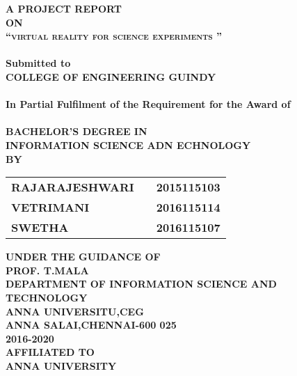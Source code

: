 \newpage
\begin{center}
\thispagestyle{empty}
\Large{\textbf{A PROJECT REPORT\\ \large{ON}}}\\[0.7cm]
\LARGE{\textsc {\textbf{``virtual reality for science experiments ''}}}\\[0.5cm]
\vspace{0.5cm}
\Large{\textbf{\\Submitted to}}
\LARGE{\textbf{\\COLLEGE OF ENGINEERING GUINDY\\}}
\vspace{1cm}
\Large{\textbf{\\In Partial Fulfilment of the Requirement for the Award of\\}}
\Large{\textbf{\\BACHELOR'S DEGREE IN\\INFORMATION SCIENCE ADN ECHNOLOGY}}
\vspace{1cm}
\Large{\textbf{\\BY}}\\[0.5cm]
\begin{table}[h]
\centering
\Large{
\begin{tabular}{>{\bfseries}lc>{\bfseries}r}
RAJARAJESHWARI& & 2015115103\\VETRIMANI & & 2016115114\\SWETHA & & 2016115107\\
\end{tabular}}
\end{table}
\vspace{0.5cm}
\large{\textbf{UNDER THE GUIDANCE OF}}\\
\large{\textbf{PROF. T.MALA}}\\
\vspace{1cm}
\large{\textbf{DEPARTMENT OF INFORMATION SCIENCE AND TECHNOLOGY}}\\
\Large{\textbf{ANNA UNIVERSITU,CEG}}\\
\large{\textbf{ANNA SALAI,CHENNAI-600 025}}
\large{\textbf{\\2016-2020}}\\
\vspace{1cm}
\Large{\textbf{AFFILIATED TO\\}}
\LARGE{\textbf{ANNA UNIVERSITY }}
\newpage
\end{center}